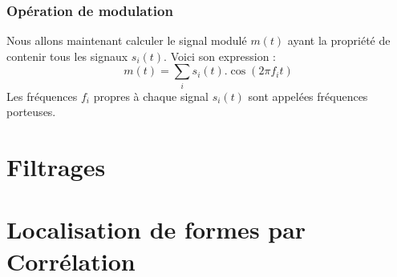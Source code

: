 \documentclass{article}
\begin{document}
\subsubsection{Opération de modulation}
Nous allons maintenant calculer le signal modulé $m(t)$ ayant la propriété de contenir tous les signaux $s_i(t)$. Voici son expression :
$$m(t)=\sum_{i}s_i(t).\cos(2\pi f_i t)$$
Les fréquences $f_i$ propres à chaque signal $s_i(t)$ sont appelées fréquences porteuses.
\section{Filtrages}
\section{Localisation de formes par Corrélation}
\end{document}
